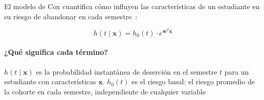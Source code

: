 \documentclass[12pt]{article}
\begin{document}
El modelo de Cox cuantifica cómo influyen las características de un estudiante en su
riesgo de abandonar en cada semestre~\cite{cox1972}:

\begin{equation}
    h(t \mid \mathbf{x}) = h_0(t) \cdot e^{\mathbf{w}^T \mathbf{x}}
    \label{eq:cox}
\end{equation}

\paragraph{¿Qué significa cada término?}
$h(t \mid \mathbf{x})$ es la probabilidad instantánea de deserción en el semestre $t$
para un estudiante con características $\mathbf{x}$. $h_0(t)$ es el riesgo basal: el
riesgo promedio de la cohorte en cada semestre, independiente de cualquier variable
\end{document}
